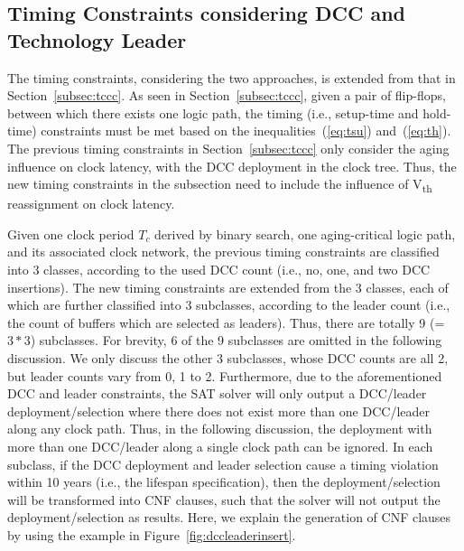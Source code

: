 \subsection{Timing Constraints considering DCC and Technology Leader}
\label{sec:TVA:timingconstraint}
\begin{figure*}
    \centering
    \hspace{1cm}
    \caption{Examples of DCC insertion}
    \label{fig:dccleaderinsert}
\end{figure*}
The timing constraints, considering the two approaches, is extended from that in Section~\ref{subsec:tccc}. As seen in Section~\ref{subsec:tccc}, given a pair of flip-flops, between which there exists one logic path, the timing (i.e., setup-time and hold-time) constraints must be met based on the inequalities~(\ref{eq:tsu}) and~(\ref{eq:th}). The previous timing constraints in Section~\ref{subsec:tccc} only consider the aging influence on clock latency, with the DCC deployment in the clock tree. Thus, the new timing constraints in the subsection need to include the influence of V\textsubscript{th} reassignment on clock latency. 

Given one clock period $T_c$ derived by binary search, one aging-critical logic path, and its associated clock network, the previous timing constraints are classified into 3 classes, according to the used DCC count (i.e., no, one, and two DCC insertions). The new timing constraints are extended from the 3 classes, each of which are further classified into 3 subclasses, according to the leader count (i.e., the count of buffers which are selected as leaders). Thus, there are totally 9 (= $3*3$) subclasses. For brevity, 6 of the 9 subclasses are omitted in the following discussion. We only discuss the other 3 subclasses, whose DCC counts are all 2, but leader counts vary from 0, 1 to 2. Furthermore, due to the aforementioned DCC and leader constraints, the SAT solver will only output a DCC/leader deployment/selection where there does not exist more than one DCC/leader along any clock path. Thus, in the following discussion, the deployment with more than one DCC/leader along a single clock path can be ignored. In each subclass, if the DCC deployment and leader selection cause a timing violation within 10 years (i.e., the lifespan specification), then the deployment/selection will be transformed into CNF clauses, such that the solver will not output the deployment/selection as results. Here, we explain the generation of CNF clauses by using the example in Figure~\ref{fig:dccleaderinsert}.

